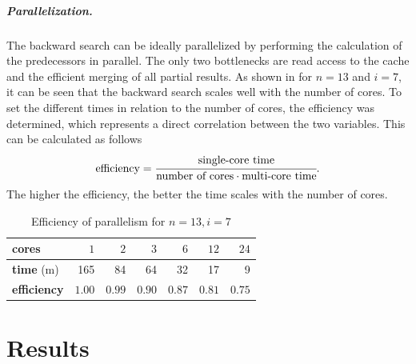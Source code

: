 \documentclass[a4paper,UKenglish,cleveref, autoref, thm-restate, anonymous]{lipics-v2021}
\begin{document}
\subparagraph{Parallelization.} \label{sec:backward:parallelisation}
The backward search can be ideally parallelized by performing the calculation of the predecessors in parallel.
The only two bottlenecks are read access to the cache and the efficient merging of all partial results.
As shown in  for $n = 13$ and $i = 7$, it can be seen that the backward search scales well with the number of cores.
To set the different times in relation to the number of cores, the efficiency was determined, which represents a direct correlation between the two variables.
This can be calculated as follows
\[
  \text{efficiency} = \cfrac{\text{single-core time}}{\text{number of cores} \cdot \text{multi-core time}}\text.
\]
The higher the efficiency, the better the time scales with the number of cores.

\begin{table}[!t]
  \renewcommand{\arraystretch}{1.1}
  \caption{Efficiency of parallelism for $n = 13, i = 7$}
  \label{table:backward-parallel}
  \centering
  \small
  \begin{tabular}{l|rrrrrr}
    \textbf{cores}      & $1$    & $2$    & $3$    & $6$    & $12$   & $24$   \\ \hline
    \textbf{time} (m)   & 165    & 84     & 64     & 32     & 17     & 9      \\ \hline
    \textbf{efficiency} & $1.00$ & $0.99$ & $0.90$ & $0.87$ & $0.81$ & $0.75$
  \end{tabular}
\end{table}

\section{Results}
\end{document}
